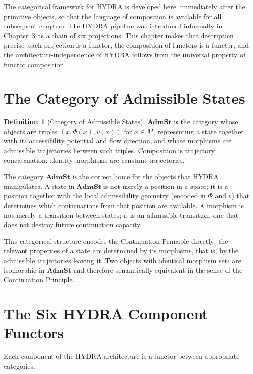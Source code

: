 \documentclass[12pt, oneside]{book}
\theoremstyle{flyxion}
\theoremstyle{definition}
\newtheorem{definition}[theorem]{Definition}
\begin{document}
The categorical framework for HYDRA is developed here,
immediately after the primitive objects, so that the
language of composition is available for all subsequent
chapters. The HYDRA pipeline was introduced informally in
Chapter~3 as a chain of six projections. This chapter
makes that description precise: each projection is a
functor, the composition of functors is a functor, and
the architecture-independence of HYDRA follows from the
universal property of functor composition.

\section{The Category of Admissible States}

\begin{definition}[Category of Admissible States]
$\mathbf{AdmSt}$ is the category whose objects are triples
$(x, \Phi(x), v(x))$ for $x \in M$, representing a state
together with its accessibility potential and flow direction,
and whose morphisms are admissible trajectories between
such triples. Composition is trajectory concatenation;
identity morphisms are constant trajectories.
\end{definition}

The category $\mathbf{AdmSt}$ is the correct home for the
objects that HYDRA manipulates. A state in $\mathbf{AdmSt}$
is not merely a position in a space; it is a position
together with the local admissibility geometry (encoded in
$\Phi$ and $v$) that determines which continuations from
that position are available. A morphism is not merely a
transition between states; it is an admissible transition,
one that does not destroy future continuation capacity.

This categorical structure encodes the Continuation
Principle directly: the relevant properties of a state
are determined by its morphisms, that is, by the
admissible trajectories leaving it. Two objects with
identical morphism sets are isomorphic in $\mathbf{AdmSt}$
and therefore semantically equivalent in the sense of
the Continuation Principle.

\section{The Six HYDRA Component Functors}

Each component of the HYDRA architecture is a functor
between appropriate categories.
\end{document}
